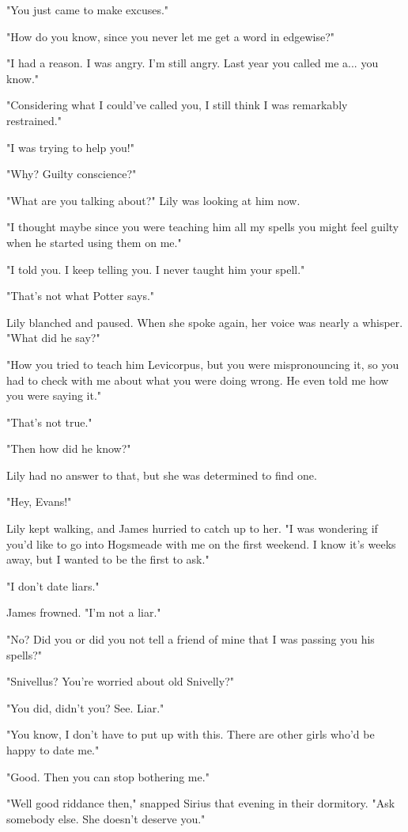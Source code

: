 \documentclass[a4paper,11pt]{article}
\begin{document}
"You just came to make excuses."

"How do you know, since you never let me get a word in edgewise?"

"I had a reason. I was angry. I'm still angry. Last year you called me a... you know."

"Considering what I could've called you, I still think I was remarkably restrained."

"I was trying to help you!"

"Why? Guilty conscience?"

"What are you talking about?" Lily was looking at him now.

"I thought maybe since you were teaching him all my spells you might feel guilty when he started using them on me."

"I told you. I keep telling you. I never taught him your spell."

"That's not what Potter says."

Lily blanched and paused. When she spoke again, her voice was nearly a whisper. "What did he say?"

"How you tried to teach him Levicorpus, but you were mispronouncing it, so you had to check with me about what you were doing wrong. He even told me how you were saying it."

"That's not true."

"Then how did he know?"

Lily had no answer to that, but she was determined to find one.

"Hey, Evans!"

Lily kept walking, and James hurried to catch up to her. "I was wondering if you'd like to go into Hogsmeade with me on the first weekend. I know it's weeks away, but I wanted to be the first to ask."

"I don't date liars."

James frowned. "I'm not a liar."

"No? Did you or did you not tell a friend of mine that I was passing you his spells?"

"Snivellus? You're worried about old Snivelly?"

"You did, didn't you? See. Liar."

"You know, I don't have to put up with this. There are other girls who'd be happy to date me."

"Good. Then you can stop bothering me."

"Well good riddance then," snapped Sirius that evening in their dormitory. "Ask somebody else. She doesn't deserve you."
\end{document}
